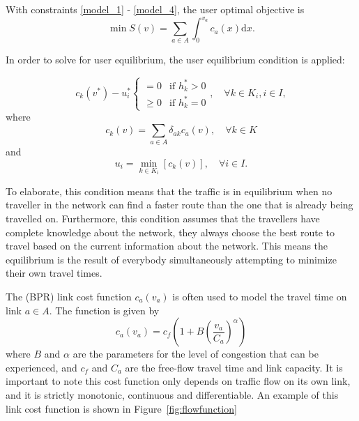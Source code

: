 With constraints \eqref{model_1} - \eqref{model_4},
the user optimal objective is
\begin{equation} \label{eq:user_optimal}
    \min S(v) = \sum_{a\in A} \int_0^{v_a} c_a(x) \mathrm{d} x.
\end{equation}

In order to solve for user equilibrium,
the \citep{Wardrop} user equilibrium condition is applied:

\begin{equation} \label{wardrop1}
    c_k(v^{\ast}) - u_i^{\ast} 
    \begin{cases}
        =0 & \text{if } h_k^{\ast} > 0 \\
        \geq 0 & \text{if } h_k^{\ast} = 0
    \end{cases}
    ,
    \quad \forall k \in K_i, i \in I,
\end{equation}
where 
\begin{equation}
    c_k(v) = \sum_{a \in A} \delta_{ak} c_a(v), \quad \forall k \in K
\end{equation}
and
\begin{equation} \label{wardrop3}
    u_i = \min_{k \in K_i} \left[ c_k(v) \right], \quad \forall i \in I.
\end{equation}

To elaborate, this condition means that the traffic is in equilibrium when no traveller in the network can find a faster route than the one that is already being travelled on.
Furthermore, this condition assumes that the travellers have complete knowledge about the network,
they always choose the best route to travel based on the current information about the network.
This means the equilibrium is the result of everybody simultaneously attempting to minimize their own travel times.

The \citet{BPR} (BPR) link cost function
$c_a(v_a)$ is often used to model the travel time on link $a \in A$.
The function is given by
\begin{equation}
    c_a(v_a) = c_f \left(1 + B \left( \frac{v_a}{C_a} \right)^\alpha \right)
\end{equation}
where $B$ and $\alpha$ are the parameters for the level of congestion that can be experienced,
and $c_f$ and $C_a$ are the free-flow travel time and link capacity.
It is important to note this cost function only depends on traffic flow on its own link, and it is strictly monotonic, continuous and differentiable.
An example of this link cost function is shown in Figure~\ref{fig:flowfunction}

